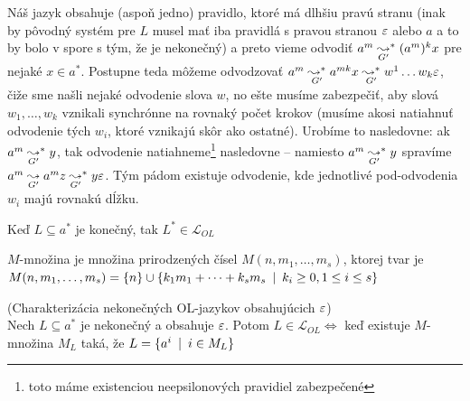 \begin{dokaz}
\begin{enumerate}
\begin{description}
\begin{description}
                Náš jazyk obsahuje (aspoň jedno) pravidlo, ktoré má
                dlhšiu pravú stranu (inak by pôvodný systém pre $L$
                musel mať iba pravidlá s pravou stranou $\varepsilon$ alebo
                $a$ a to by bolo v spore s tým, že je nekonečný)
                a preto vieme odvodiť
                $a^m \underset{G'}{\leadsto}^* (a^m)^{k} x$ pre nejaké
                $x\in a^{*}$. Postupne teda môžeme odvodzovať
                $a^m \underset{G'}{\leadsto^*} a^{mk} x
                     \underset{G'}{\leadsto^*} w^1 \dots w_k \varepsilon$,
                čiže sme našli nejaké odvodenie slova $w$, no
                ešte musíme zabezpečiť, aby slová $w_1, \dots, w_k$ vznikali
                synchrónne na rovnaký počet krokov
                (musíme akosi natiahnuť odvodenie tých $w_i$,
                ktoré vznikajú skôr ako ostatné).
                Urobíme to nasledovne: ak $a^m
                \underset{G'}{\leadsto}^* y$,
                tak odvodenie natiahneme\footnote{
                    toto máme existenciou neepsilonových pravidiel zabezpečené
                } nasledovne -- namiesto $a^m
                \underset{G'}{\leadsto}^* y$ 
                spravíme
                $a^m \underset{G'}{\leadsto} a^{m} z
                     \underset{G'}{\leadsto}^* y\varepsilon$.
                Tým pádom existuje odvodenie, kde
                jednotlivé pod-odvodenia $w_{i}$ majú rovnakú dĺžku.
            \end{description}
        \end{description}
    \end{enumerate}
\end{dokaz}

\begin{poznamka}
    Keď $L\subseteq a^{*}$ je konečný, tak $L^{*}\in\mathcal{L}_{OL}$
\end{poznamka}

\begin{definicia}
    $M$-množina je množina prirodzených čísel
    $M(n,m_{1},\dots,m_{s})$, ktorej tvar je
    \mbox{$M(n,m_{1},\dots,m_{s})=\{n\}\cup\{k_{1}m_{1}
    +\dots+k_{s}m_{s}\enspace |\enspace k_{i}\geq0,1\leq i\leq s\}$}
\end{definicia}

\begin{veta}
    \label{nekon_ol} (Charakterizácia nekonečných OL-jazykov
    obsahujúcich $\varepsilon$)
    \\ Nech $L\subseteq a^{*}$ je
    ne\-ko\-neč\-ný a obsahuje $\varepsilon$. Potom
    $L\in\mathcal{L}_{OL}\Longleftrightarrow$ keď existuje $M$-množina
    $M_{L}$ taká, že $L=\{a^{i}\enspace |\enspace i\in M_{L}\}$
\end{veta}

